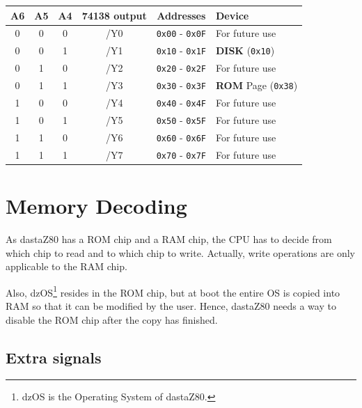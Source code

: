 \documentclass[a4paper,11pt]{article}
\begin{document}
    \begin{tabular}{| c | c | c | c | c | m{4.5cm} | }
        \hline
        \rowcolor{lightgray}
        A6 & A5 & A4 & 74138 output & Addresses & Device\\
        \hline
        0 & 0 & 0 & /Y0 & \texttt{0x00} - \texttt{0x0F} & For future use\\
        \hline
        0 & 0 & 1 & /Y1 & \texttt{0x10} - \texttt{0x1F} & \textbf{DISK}
        (\texttt{0x10})\\
        \hline
        0 & 1 & 0 & /Y2 & \texttt{0x20} - \texttt{0x2F} & For future use\\
        \hline
        0 & 1 & 1 & /Y3 & \texttt{0x30} - \texttt{0x3F} & \textbf{ROM} Page
        (\texttt{0x38})\\
        \hline
        1 & 0 & 0 & /Y4 & \texttt{0x40} - \texttt{0x4F} & For future use\\
        \hline
        1 & 0 & 1 & /Y5 & \texttt{0x50} - \texttt{0x5F} & For future use\\
        \hline
        1 & 1 & 0 & /Y6 & \texttt{0x60} - \texttt{0x6F} & For future use\\
        \hline
        1 & 1 & 1 & /Y7 & \texttt{0x70} - \texttt{0x7F} & For future use\\
        \hline
    \end{tabular}
    
    \pagebreak
    \section{Memory Decoding}

    As dastaZ80 has a ROM chip and a RAM chip, the CPU has to decide from which 
    chip to read and to which chip to write. Actually, write operations are only
    applicable to the RAM chip.

    Also, dzOS\footnote{dzOS is the Operating System of dastaZ80.} resides in
    the ROM chip, but at boot the entire OS is copied into RAM so that it can be
    modified by the user. Hence, dastaZ80 needs a way to disable the ROM chip
    after the copy has finished.

    \subsection{Extra signals}
\end{document}

